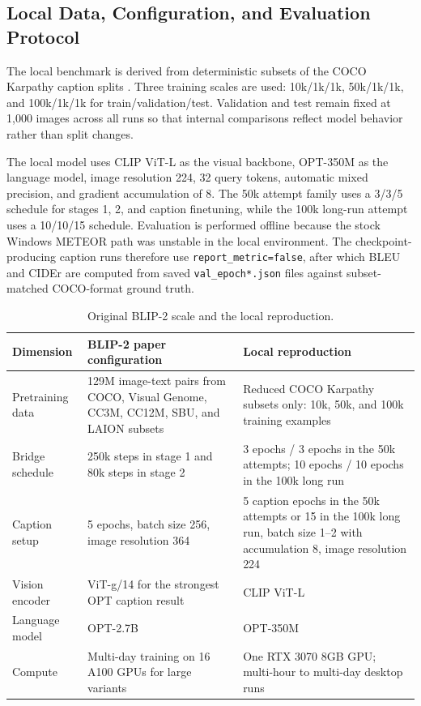 \documentclass[11pt]{article}
\begin{document}
\subsection{Local Data, Configuration, and Evaluation Protocol}
The local benchmark is derived from deterministic subsets of the COCO Karpathy caption
splits \citep{lin2014coco}. Three training scales are used: 10k/1k/1k, 50k/1k/1k, and
100k/1k/1k for train/validation/test. Validation and test remain fixed at 1,000 images
across all runs so that internal comparisons reflect model behavior rather than split
changes.

The local model uses CLIP ViT-L as the visual backbone, OPT-350M as the language model,
image resolution 224, 32 query tokens, automatic mixed precision, and gradient
accumulation of 8. The 50k attempt family uses a 3/3/5 schedule for stages 1, 2, and
caption finetuning, while the 100k long-run attempt uses a 10/10/15 schedule.
Evaluation is performed offline because the stock Windows METEOR path was unstable in
the local environment. The checkpoint-producing caption runs therefore use
\texttt{report\_metric=false}, after which BLEU and CIDEr are computed from saved
\texttt{val\_epoch*.json} files against subset-matched COCO-format ground truth.

\begin{table}[H]
\centering
\scriptsize
\setlength{\tabcolsep}{4pt}
\begin{tabularx}{\linewidth}{p{3.2cm} Y Y}
\toprule
Dimension & BLIP-2 paper configuration & Local reproduction \\
\midrule
Pretraining data & 129M image-text pairs from COCO, Visual Genome, CC3M, CC12M, SBU, and LAION subsets \citep{li2023blip2} & Reduced COCO Karpathy subsets only: 10k, 50k, and 100k training examples \\
Bridge schedule & 250k steps in stage 1 and 80k steps in stage 2 \citep{li2023blip2} & 3 epochs / 3 epochs in the 50k attempts; 10 epochs / 10 epochs in the 100k long run \\
Caption setup & 5 epochs, batch size 256, image resolution 364 \citep{li2023blip2} & 5 caption epochs in the 50k attempts or 15 in the 100k long run, batch size 1--2 with accumulation 8, image resolution 224 \\
Vision encoder & ViT-g/14 for the strongest OPT caption result \citep{li2023blip2} & CLIP ViT-L \\
Language model & OPT-2.7B \citep{li2023blip2} & OPT-350M \\
Compute & Multi-day training on 16 A100 GPUs for large variants \citep{li2023blip2} & One RTX 3070 8GB GPU; multi-hour to multi-day desktop runs \\
\bottomrule
\end{tabularx}
\caption{Original BLIP-2 scale and the local reproduction.}
\label{tab:setup-compare-v2}
\end{table}
\end{document}
